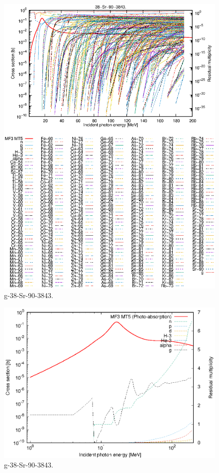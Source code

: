 \begin{figure}
 \includegraphics[width=\linewidth]{eps/g_38-Sr-90_3843.eps}
  \caption{g-38-Sr-90-3843.}
\end{figure}
\newpage \clearpage

\begin{figure}
 \includegraphics[width=\linewidth]{eps-log/g_38-Sr-90_3843.eps}
 \caption{g-38-Sr-90-3843.}
\end{figure}
\newpage \clearpage

